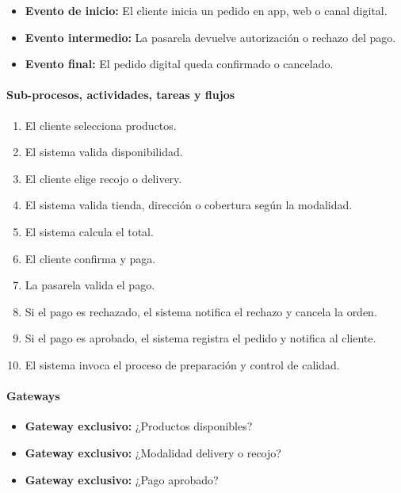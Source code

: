 \documentclass[a4paper,12pt]{article}
\begin{document}
\begin{itemize}
    \item \textbf{Evento de inicio:} El cliente inicia un pedido en app, web o canal digital.
    \item \textbf{Evento intermedio:} La pasarela devuelve autorización o rechazo del pago.
    \item \textbf{Evento final:} El pedido digital queda confirmado o cancelado.
\end{itemize}

\paragraph{Sub-procesos, actividades, tareas y flujos}

\begin{enumerate}
    \item El cliente selecciona productos.
    \item El sistema valida disponibilidad.
    \item El cliente elige recojo o delivery.
    \item El sistema valida tienda, dirección o cobertura según la modalidad.
    \item El sistema calcula el total.
    \item El cliente confirma y paga.
    \item La pasarela valida el pago.
    \item Si el pago es rechazado, el sistema notifica el rechazo y cancela la orden.
    \item Si el pago es aprobado, el sistema registra el pedido y notifica al cliente.
    \item El sistema invoca el proceso de preparación y control de calidad.
\end{enumerate}

\paragraph{Gateways}

\begin{itemize}
    \item \textbf{Gateway exclusivo:} ¿Productos disponibles?
    \item \textbf{Gateway exclusivo:} ¿Modalidad delivery o recojo?
    \item \textbf{Gateway exclusivo:} ¿Pago aprobado?
\end{itemize}
\end{document}
